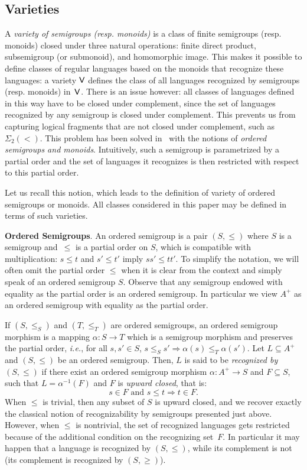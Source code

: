 \documentclass[a4paper,USenglish]{lipics}
\newcommand\Vbf{\ensuremath{{\sf V}}\xspace}
\newcommand{\sio}[1]{\ensuremath{\Sigma_{#1}(<)}\xspace}
\newcommand{\sdo}{\sio{2}}
\newcommand\highlight[1]{\par\bigskip\noindent\textbf{\sffamily #1}.}
\theoremstyle{plain}
\begin{document}
\subsection{Varieties}
\label{sec:varieties}

A \emph{variety of semigroups (resp. monoids)} is a class of finite semigroups
(resp. monoids) closed under three natural operations: finite direct product,
subsemigroup (or submonoid), and homomorphic image. This makes it possible to
define classes of regular languages based on the monoids that recognize these
languages: a variety \Vbf defines the class of all languages
recognized by semigroups (resp. monoids) in~\Vbf. There is an issue however:
all classes of languages defined in this way have to be closed under
complement, since the set of languages recognized by any semigroup is closed
under complement. This prevents us from capturing logical fragments that are
not closed under complement, such as \sdo. This problem has been solved
in~\cite{porder} with the notions of \emph{ordered semigroups and
  monoids}. Intuitively, such a semigroup is parametrized by a partial order
and the set of languages it recognizes is then restricted with respect to this
partial order.

Let us recall this notion, which leads to the definition of variety of ordered
semigroups or monoids. All classes considered in this paper may be defined in
terms of such varieties.

\highlight{Ordered Semigroups} An ordered semigroup is a pair $(S,\leqslant)$
where $S$ is a semigroup and~$\leqslant$ is a partial order on $S$, which
is compatible with multiplication: $s \leqslant t$ and $s' \leqslant t'$ imply
$ss' \leqslant tt'$. To simplify the notation, we will often omit the
partial order $\leqslant$ when it is clear from the context and simply
speak of an ordered semigroup $S$. Observe that any semigroup endowed
with equality as the partial order is an ordered semigroup. In
particular we view $A^+$ as an ordered semigroup with equality as the
partial order.

If $(S,\leqslant_S)$ and $(T,\leqslant_T)$ are ordered semigroups, an ordered
semigroup morphism is a mapping $\alpha: S \rightarrow T$ which
is a semigroup morphism and preserves the partial order, \emph{i.e.}, for all
$s,s' \in S$, $s \leqslant_S s' \Rightarrow \alpha(s) \leqslant_T \alpha(s')$. Let
$L \subseteq A^+$ and $(S,\leqslant)$ be an ordered semigroup. Then, $L$ is
said to be \emph{recognized by $(S,\leqslant)$} if there exist an ordered
semigroup morphism $\alpha: A^+ \rightarrow S$ and $F \subseteq S$,
such that $L = \alpha^{-1}(F)$ and $F$ is \emph{upward closed}, that is:
\[
s \in F \text{ and } s \leqslant t \Rightarrow t \in F.
\]
When $\leqslant$ is trivial, then any subset of $S$ is upward closed, and we
recover exactly the classical notion of recognizability by semigroups
presented just above. However, when $\leqslant$ is nontrivial, the set of
recognized languages gets restricted because of the additional condition on
the recognizing set~$F$. In particular it may happen that a language is
recognized by $(S,\leqslant)$, while its complement is not (its complement is
recognized by $(S,\geqslant)$).
\end{document}
